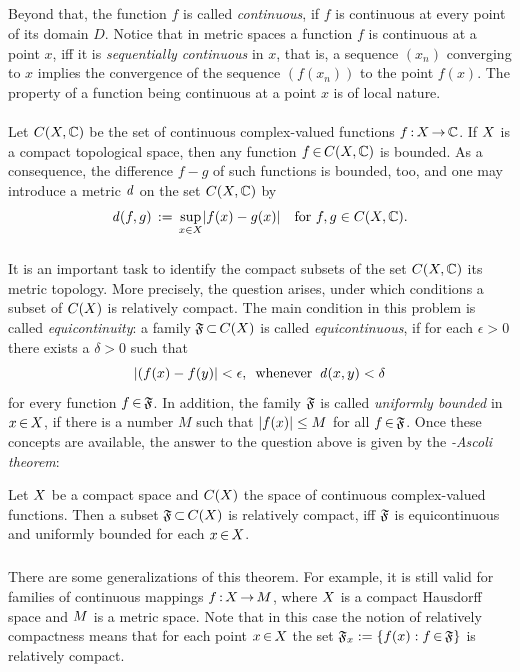 \documentclass[11pt,twoside]{article}
\begin{document}
\subparagraph{}
Beyond that,
the function $f$ is called \textit{continuous},
if $f$ is continuous at every point of its domain $D$.
Notice
that in metric spaces a function $f$ is continuous at a point $x$,
iff it is \textit{sequentially continuous} in $x$, that is,
a sequence $(x_n)$ converging to $x$ implies the
convergence of the sequence $(f(x_n))$ to the point $f(x)$.
The property of a function being continuous at a point $x$
is of local nature.

\paragraph{} %
Let $C(X,{\mathbb{C}})$ be the set of continuous complex-valued functions
$f {\,:\,} X {\,\to\,} {\mathbb{C}}$.
If $X$ is a compact topological space,
then any function $f {\,\in\,} C(X,{\mathbb{C}})$ is bounded.
As a consequence,
the difference $f{-}g$ of such functions is bounded,
too,
and one may introduce a metric $\mathit{d}$ on the set $C(X,{\mathbb{C}})$ by
\[
\d(f,g) \eqdef \sup_{x \in \topX} \abs{ f(x)-g(x) }
\quad \mbox{for } f,g \in C(\topX,\C).
\]

\subparagraph{}
It is an important task to identify the compact subsets
of the set $C(X,{\mathbb{C}})$ {\wrt} its metric topology.
More precisely,
the question arises,
under which conditions a subset of $C(X)$ is relatively compact.
The main condition in this problem is called \textit{equicontinuity}:
a family $\mathfrak{F} {\,\subset\,} C(X)$  is called \textit{equicontinuous},
if for each $\epsilon > 0$ there exists a $\delta > 0$ such that
\[
\abs{(f(x)-f(y)} < \epsilon, \, \mbox{ whenever } \, \d(x,y) < \delta
\]
for every function $f {\,\in\,} \mathfrak{F}$.
In addition,
the family $\mathfrak{F}$ is called \textit{uniformly bounded} in $x {\,\in\,} X$,
if there is a number $M$ such that $\abs{f(x)} \leq M$ for all $f {\,\in\,} \mathfrak{F}$.
Once these concepts are available,
the answer to the question above is given
by the \textit{{\ARZELA}-Ascoli theorem}:

\begin{theorem}\label{ARZELA_ASCOLI_THEOREM}
Let $X$ be a compact space and $C(X)$ the
space of continuous complex-valued functions.
Then a subset $\mathfrak{F} {\,\subset\,} C(X)$ is relatively compact,
iff $\mathfrak{F}$ is equicontinuous and uniformly bounded for each $x {\,\in\,} X$.
\end{theorem}

\subparagraph{}
There are some generalizations of this theorem.
For example,
it is still valid for families of continuous mappings $f {\,:\,} X {\,\to\,} M$,
where $X$ is a compact Hausdorff space and $M$ is a metric space.
Note that in this case the notion of relatively compactness means
that for each point $x {\,\in\,} X$
the set $\mathfrak{F}_x := \{ f(x): f {\,\in\,} \mathfrak{F} \}$ is relatively compact.
\end{document}
